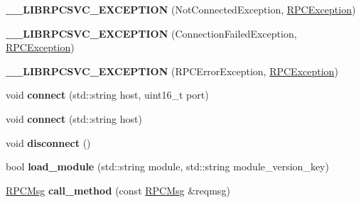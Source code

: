 \begin{DoxyCompactItemize}
\item 
\hypertarget{classwisc_1_1RPCSvc_a421b498d3a3997b476d3f3baba1a4525}{
{\bfseries \_\-\_\-LIBRPCSVC\_\-EXCEPTION} (NotConnectedException, \hyperlink{classwisc_1_1RPCSvc_1_1RPCException}{RPCException})}
\label{classwisc_1_1RPCSvc_a421b498d3a3997b476d3f3baba1a4525}

\item 
\hypertarget{classwisc_1_1RPCSvc_a8de118928711dbe103d7a312f29c3c55}{
{\bfseries \_\-\_\-LIBRPCSVC\_\-EXCEPTION} (ConnectionFailedException, \hyperlink{classwisc_1_1RPCSvc_1_1RPCException}{RPCException})}
\label{classwisc_1_1RPCSvc_a8de118928711dbe103d7a312f29c3c55}

\item 
\hypertarget{classwisc_1_1RPCSvc_afc0414202235bd42b53563d2eb652799}{
{\bfseries \_\-\_\-LIBRPCSVC\_\-EXCEPTION} (RPCErrorException, \hyperlink{classwisc_1_1RPCSvc_1_1RPCException}{RPCException})}
\label{classwisc_1_1RPCSvc_afc0414202235bd42b53563d2eb652799}

\item 
\hypertarget{classwisc_1_1RPCSvc_a3cceb5fc116584063b410ee5b16119e0}{
void {\bfseries connect} (std::string host, uint16\_\-t port)}
\label{classwisc_1_1RPCSvc_a3cceb5fc116584063b410ee5b16119e0}

\item 
\hypertarget{classwisc_1_1RPCSvc_aef442356b09a4a2c0a43ab8a2d41bb37}{
void {\bfseries connect} (std::string host)}
\label{classwisc_1_1RPCSvc_aef442356b09a4a2c0a43ab8a2d41bb37}

\item 
\hypertarget{classwisc_1_1RPCSvc_a8f6d3f7689b6634d6e420f98e9fa6cbb}{
void {\bfseries disconnect} ()}
\label{classwisc_1_1RPCSvc_a8f6d3f7689b6634d6e420f98e9fa6cbb}

\item 
\hypertarget{classwisc_1_1RPCSvc_a06b562ce7ad2a80be7b8af5003992e54}{
bool {\bfseries load\_\-module} (std::string module, std::string module\_\-version\_\-key)}
\label{classwisc_1_1RPCSvc_a06b562ce7ad2a80be7b8af5003992e54}

\item 
\hypertarget{classwisc_1_1RPCSvc_af8e2a94539ebf0af27c083ac82e5cf80}{
\hyperlink{classwisc_1_1RPCMsg}{RPCMsg} {\bfseries call\_\-method} (const \hyperlink{classwisc_1_1RPCMsg}{RPCMsg} \&reqmsg)}
\label{classwisc_1_1RPCSvc_af8e2a94539ebf0af27c083ac82e5cf80}

\end{DoxyCompactItemize}
